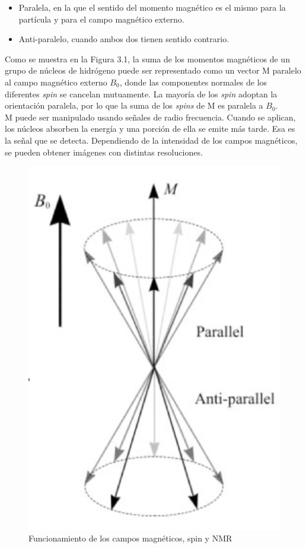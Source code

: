 \begin{itemize}
	\item Paralela, en la que el sentido del momento magnético es el mismo para la partícula y para el campo magnético externo.
	\item Anti-paralelo, cuando ambos dos tienen sentido contrario.
\end{itemize}

Como se muestra en la Figura 3.1, la suma de los momentos magnéticos de un grupo de núcleos de hidrógeno puede ser representado como un vector M paralelo al campo magnético externo $B_0$, donde las componentes normales de los diferentes \textit{spin} se cancelan mutuamente. La mayoría de los \textit{spin} adoptan la orientación paralela, por lo que la suma de los \textit{spins} de M es paralela a $B_0$. \\

M puede ser manipulado usando señales de radio frecuencia. Cuando se aplican, los núcleos absorben la energía y una porción de ella se emite más tarde. Esa es la señal que se detecta. Dependiendo de la intensidad de los campos magnéticos, se pueden obtener imágenes con distintas resoluciones.

 \begin{figure}[H] %
 	\centering
 	\includegraphics[scale=0.34]{nmr.png}  %
 	\caption{Funcionamiento de los campos magnéticos, spin y NMR} 
 	\label{fig:nmr}
 \end{figure}

